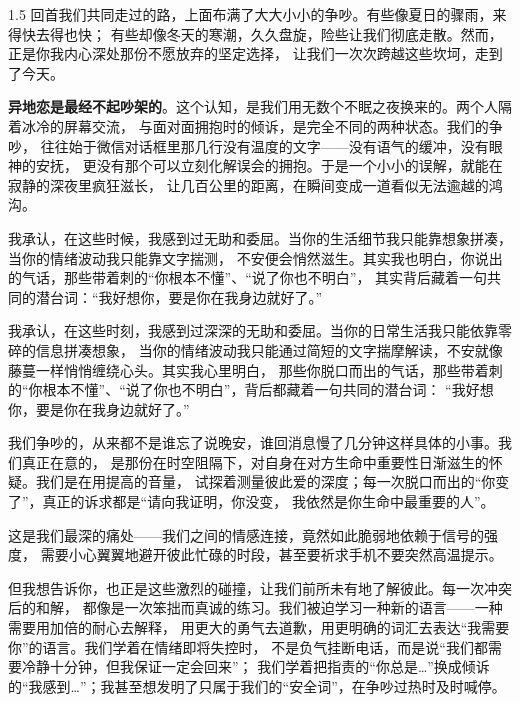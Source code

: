 
\clearpage


\subtitle{关于吵架}

\large
\begin{spacing}{1.5}
    回首我们共同走过的路，上面布满了大大小小的争吵。有些像夏日的骤雨，来得快去得也快；
    有些却像冬天的寒潮，久久盘旋，险些让我们彻底走散。然而，正是你我内心深处那份不愿放弃的坚定选择，
    让我们一次次跨越这些坎坷，走到了今天。

    \textbf{异地恋是最经不起吵架的}。这个认知，是我们用无数个不眠之夜换来的。两个人隔着冰冷的屏幕交流，
    与面对面拥抱时的倾诉，是完全不同的两种状态。我们的争吵，
    往往始于微信对话框里那几行没有温度的文字——没有语气的缓冲，没有眼神的安抚，
    更没有那个可以立刻化解误会的拥抱。于是一个小小的误解，就能在寂静的深夜里疯狂滋长，
    让几百公里的距离，在瞬间变成一道看似无法逾越的鸿沟。

    我承认，在这些时候，我感到过无助和委屈。当你的生活细节我只能靠想象拼凑，当你的情绪波动我只能靠文字揣测，
    不安便会悄然滋生。其实我也明白，你说出的气话，那些带着刺的“你根本不懂”、“说了你也不明白”，
    其实背后藏着一句共同的潜台词：“我好想你，要是你在我身边就好了。”

    我承认，在这些时刻，我感到过深深的无助和委屈。当你的日常生活我只能依靠零碎的信息拼凑想象，
    当你的情绪波动我只能通过简短的文字揣摩解读，不安就像藤蔓一样悄悄缠绕心头。其实我心里明白，
    那些你脱口而出的气话，那些带着刺的“你根本不懂”、“说了你也不明白”，背后都藏着一句共同的潜台词：
    “我好想你，要是你在我身边就好了。”

    我们争吵的，从来都不是谁忘了说晚安，谁回消息慢了几分钟这样具体的小事。我们真正在意的，
    是那份在时空阻隔下，对自身在对方生命中重要性日渐滋生的怀疑。我们是在用提高的音量，
    试探着测量彼此爱的深度；每一次脱口而出的“你变了”，真正的诉求都是“请向我证明，你没变，
    我依然是你生命中最重要的人”。

    这是我们最深的痛处——我们之间的情感连接，竟然如此脆弱地依赖于信号的强度，
    需要小心翼翼地避开彼此忙碌的时段，甚至要祈求手机不要突然高温提示。

    但我想告诉你，也正是这些激烈的碰撞，让我们前所未有地了解彼此。每一次冲突后的和解，
    都像是一次笨拙而真诚的练习。我们被迫学习一种新的语言——一种需要用加倍的耐心去解释，
    用更大的勇气去道歉，用更明确的词汇去表达“我需要你”的语言。我们学着在情绪即将失控时，
    不是负气挂断电话，而是说“我们都需要冷静十分钟，但我保证一定会回来”；
    我们学着把指责的“你总是…”换成倾诉的“我感到…”；我甚至想发明了只属于我们的“安全词”，在争吵过热时及时喊停。


\end{spacing}
